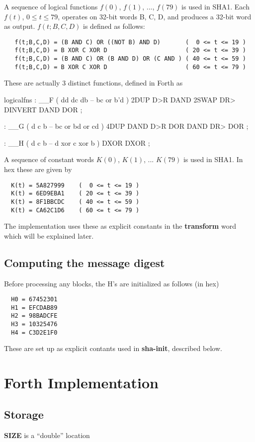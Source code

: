 A sequence of logical functions $f(0)$, $f(1)$, ..., $f(79)$ is used in
SHA1. Each $f(t)$, $0 \le t \le 79$, operates on 32-bit words B, C, D,
and produces a 32-bit word as output. $f(t;B,C,D)$ is defined as follows:
\begin{verbatim}
   f(t;B,C,D) = (B AND C) OR ((NOT B) AND D)       (  0 <= t <= 19 )
   f(t;B,C,D) = B XOR C XOR D                      ( 20 <= t <= 39 )
   f(t;B,C,D) = (B AND C) OR (B AND D) OR (C AND ) ( 40 <= t <= 59 )
   f(t;B,C,D) = B XOR C XOR D                      ( 60 <= t <= 79 )
\end{verbatim}

These are actually 3 distinct functions, defined in Forth as
\begin{chunk}{logicalfns}
: __F                 ( dd dc db -- bc or b'd )
    2DUP D>R DAND 2SWAP DR> DINVERT DAND DOR ;

: __G                 ( d c b -- bc or bd or cd )
    4DUP DAND D>R  DOR DAND DR>  DOR ;

: __H                 ( d c b -- d xor c xor b )
    DXOR DXOR ;

\end{chunk}

A sequence of constant words $K(0)$, $K(1)$, ... $K(79)$ is used in
SHA1. In hex these are given by
\begin{verbatim}
  K(t) = 5A827999    (  0 <= t <= 19 )
  K(t) = 6ED9EBA1    ( 20 <= t <= 39 )
  K(t) = 8F1BBCDC    ( 40 <= t <= 59 )
  K(t) = CA62C1D6    ( 60 <= t <= 79 )
\end{verbatim}
The implementation uses these as explicit constants 
in the {\bf transform} word which will be explained later.

\subsection{Computing the message digest}
Before processing any blocks, the H's are initialized as follows (in hex)
\begin{verbatim}
  H0 = 67452301
  H1 = EFCDAB89
  H2 = 98BADCFE
  H3 = 10325476
  H4 = C3D2E1F0
\end{verbatim}
These are set up as explicit contants used in {\bf sha-init}, described
below.

\section{Forth Implementation}
\subsection{Storage}
{\bf SIZE} is a ``double'' location

